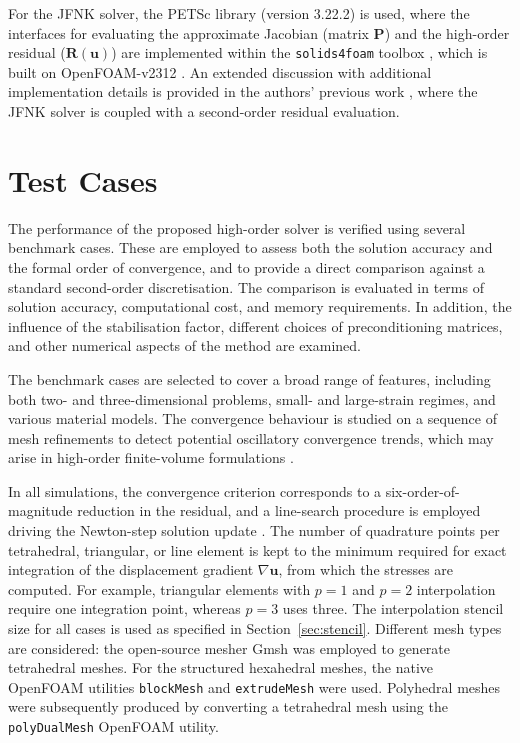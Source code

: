 \documentclass[review,3p]{elsarticle}
\newcommand{\bb}{\boldsymbol}
\begin{document}
For the JFNK solver, the PETSc library (version 3.22.2) \cite{PETSc} is used, where the interfaces for evaluating the approximate Jacobian (matrix $\bb{P}$) and the high-order residual ($\boldsymbol{R}(\bb{u})$) are implemented within the \texttt{solids4foam} toolbox \cite{Cardiff2025a, Cardiff2018, Tukovic2018}, which is built on OpenFOAM-v2312 \cite{Weller1998}.
An extended discussion with additional implementation details is provided in the authors’ previous work \cite{Cardiff2025}, where the JFNK solver is coupled with a second-order residual evaluation.
%
%
\section{Test Cases}
\label{sec:test_cases}
%
%
The performance of the proposed high-order solver is verified using several benchmark cases.
These are employed to assess both the solution accuracy and the formal order of convergence, and to provide a direct comparison against a standard second-order discretisation.
The comparison is evaluated in terms of solution accuracy, computational cost, and memory requirements.
In addition, the influence of the stabilisation factor, different choices of preconditioning matrices, and other numerical aspects of the method are examined.

The benchmark cases are selected to cover a broad range of features, including both two- and three-dimensional problems, small- and large-strain regimes,
and various material models.
The convergence behaviour is studied on a sequence of mesh refinements to detect potential oscillatory convergence trends, which may arise in high-order finite-volume formulations \cite{Nishikawa2025a}.

In all simulations, the convergence criterion corresponds to a six-order-of-magnitude reduction in the residual, and a line-search procedure is employed driving the Newton-step solution update \cite{Cardiff2025}.
The number of quadrature points per tetrahedral, triangular, or line element is kept to the minimum required for exact integration of the displacement gradient $\nabla \bb{u}$, from which the stresses are computed.
For example, triangular elements with $p=1$ and $p=2$ interpolation require one integration point, whereas $p=3$ uses three.
The interpolation stencil size for all cases is used as specified in Section~\ref{sec:stencil}.
Different mesh types are considered: the open-source mesher Gmsh \cite{geuzaine2009gmsh} was employed to generate tetrahedral meshes. 
For the structured hexahedral meshes, the native OpenFOAM utilities \texttt{blockMesh} and \texttt{extrudeMesh} were used. 
Polyhedral meshes were subsequently produced by converting a tetrahedral mesh using the \texttt{polyDualMesh} OpenFOAM utility.
%
%
%
%
\end{document}
